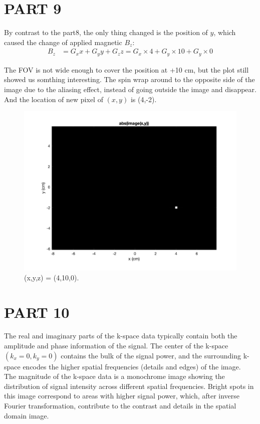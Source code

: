 \documentclass{report}
\begin{document}
\section[short]{PART 9}
By contrast to the part8, the only thing changed is the position of $y$, which caused the change of 
applied magnetic $B_z$:
\begin{align*}
 B_z &= G_{x} x + G_{y} y + G_{z} z = G_x \times 4 + G_y \times 10 + G_y \times 0
\end{align*}

The FOV is not wide enough to cover the position at +10 cm, but the plot still showed us somthing interesting. 
The spin wrap around to the opposite side of the image due to the aliasing effect, instead of going outside
 the image and disappear. And the location of new pixel of $(x,y)$ is (4,-2).
\begin{figure}[hb]
    \centering
    \includegraphics[width=1\textwidth]{9.png}
    \caption{(x,y,z) = (4,10,0).}
\end{figure}
\newpage 
\section[short]{PART 10}
The real and imaginary parts of the k-space data typically contain both the amplitude and phase information 
of the signal. The center of the k-space $(k_x=0, k_y=0)$ contains the bulk of the signal power, 
and the surrounding k-space encodes the higher spatial frequencies (details and edges) of the image.\\

The magnitude of the k-space data is a monochrome image showing the distribution of signal intensity across
different spatial frequencies. Bright spots in this image correspond to areas with higher signal power,
which, after inverse Fourier transformation, contribute to the contrast and details in the spatial domain 
image.\\
\end{document}
